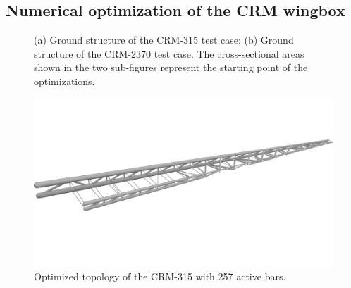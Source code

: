 \subsection{Numerical optimization of the CRM wingbox}    
    \begin{figure}
        \centering
        \bigskip
        \caption{(a) Ground structure of the CRM-315 test case; (b) Ground structure of the CRM-2370 test case. The cross-sectional areas shown in the two sub-figures represent the starting point of the optimizations.}
        \label{fig:07_crm}
    \end{figure}
    
    \begin{figure}
        \centering
        \includegraphics[width=0.8\linewidth]{figures/07_aeronautic/15_04_Topology_NLP_iso.png}
         \caption{Optimized topology of the CRM-315 with 257 active bars.}
        \label{fig:07_crm315}
    \end{figure}
    
